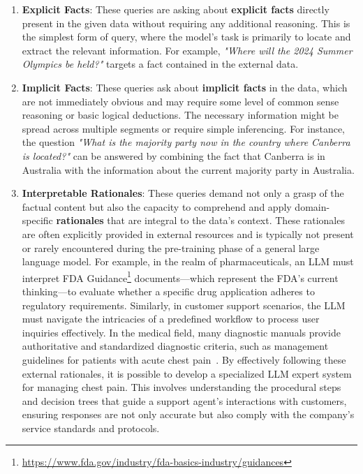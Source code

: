 \begin{enumerate}[label=\textbf{Level-\arabic*}]
    
    \item \textbf{Explicit Facts}: These queries are asking about \textbf{explicit facts} directly present in the given data without requiring any additional reasoning. This is the simplest form of query, where the model's task is primarily to locate and extract the relevant information. For example, \textit{"Where will the 2024 Summer Olympics be held?"} targets a fact contained in the external data.
    
    \item \textbf{Implicit Facts}: These queries ask about \textbf{implicit facts} in the data, which are not immediately obvious and may require some level of common sense reasoning or basic logical deductions. The necessary information might be spread across multiple segments or require simple inferencing. For instance, the question \textit{"What is the majority party now in the country where Canberra is located?"} can be answered by combining the fact that Canberra is in Australia with the information about the current majority party in Australia.
    
    \item \textbf{Interpretable Rationales}: These queries demand not only a grasp of the factual content but also the capacity to comprehend and apply domain-specific \textbf{rationales} that are integral to the data's context. These rationales are often explicitly provided in external resources and is typically not present or rarely encountered during the pre-training phase of a general large language model. For example, in the realm of pharmaceuticals, an LLM must interpret FDA Guidance\footnote{\url{https://www.fda.gov/industry/fda-basics-industry/guidances}} documents—which represent the FDA's current thinking—to evaluate whether a specific drug application adheres to regulatory requirements. Similarly, in customer support scenarios, the LLM must navigate the intricacies of a predefined workflow to process user inquiries effectively. In the medical field, many diagnostic manuals provide authoritative and standardized diagnostic criteria, such as management guidelines for patients with acute chest pain~\cite{gruettner2012clinical}. By effectively following these external rationales, it is possible to develop a specialized LLM expert system for managing chest pain. This involves understanding the procedural steps and decision trees that guide a support agent's interactions with customers, ensuring responses are not only accurate but also comply with the company's service standards and protocols. 
    

\end{enumerate}
